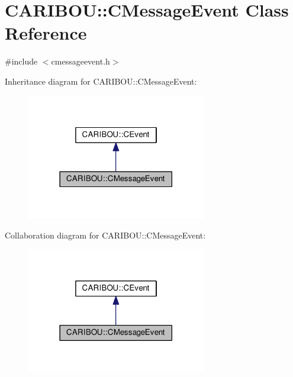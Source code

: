 \section{C\-A\-R\-I\-B\-O\-U\-:\-:C\-Message\-Event Class Reference}
\label{class_c_a_r_i_b_o_u_1_1_c_message_event}


{\ttfamily \#include $<$cmessageevent.\-h$>$}



Inheritance diagram for C\-A\-R\-I\-B\-O\-U\-:\-:C\-Message\-Event\-:\nopagebreak
\begin{figure}[H]
\begin{center}
\leavevmode
\includegraphics[width=222pt]{class_c_a_r_i_b_o_u_1_1_c_message_event__inherit__graph}
\end{center}
\end{figure}


Collaboration diagram for C\-A\-R\-I\-B\-O\-U\-:\-:C\-Message\-Event\-:\nopagebreak
\begin{figure}[H]
\begin{center}
\leavevmode
\includegraphics[width=222pt]{class_c_a_r_i_b_o_u_1_1_c_message_event__coll__graph}
\end{center}
\end{figure}
